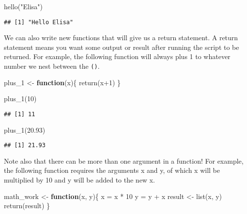 \documentclass[
]{book}
\newenvironment{Shaded}{\begin{snugshade}}{\end{snugshade}}
\newcommand{\ControlFlowTok}[1]{\textcolor[rgb]{0.13,0.29,0.53}{\textbf{#1}}}
\newcommand{\DecValTok}[1]{\textcolor[rgb]{0.00,0.00,0.81}{#1}}
\newcommand{\FloatTok}[1]{\textcolor[rgb]{0.00,0.00,0.81}{#1}}
\newcommand{\FunctionTok}[1]{\textcolor[rgb]{0.00,0.00,0.00}{#1}}
\newcommand{\NormalTok}[1]{#1}
\newcommand{\OtherTok}[1]{\textcolor[rgb]{0.56,0.35,0.01}{#1}}
\newcommand{\SpecialCharTok}[1]{\textcolor[rgb]{0.00,0.00,0.00}{#1}}
\newcommand{\StringTok}[1]{\textcolor[rgb]{0.31,0.60,0.02}{#1}}
\begin{document}
\begin{Shaded}
\begin{Highlighting}[]
\FunctionTok{hello}\NormalTok{(}\StringTok{"Elisa"}\NormalTok{)}
\end{Highlighting}
\end{Shaded}

\begin{verbatim}
## [1] "Hello Elisa"
\end{verbatim}

We can also write new functions that will give us a return statement. A return statement means you want some output or result after running the script to be returned. For example, the following function will always plus 1 to whatever number we nest between the \texttt{()}.

\begin{Shaded}
\begin{Highlighting}[]
\NormalTok{plus\_1 }\OtherTok{\textless{}{-}} \ControlFlowTok{function}\NormalTok{(x)\{}
    \FunctionTok{return}\NormalTok{(x}\SpecialCharTok{+}\DecValTok{1}\NormalTok{)}
\NormalTok{\}}
\end{Highlighting}
\end{Shaded}

\begin{Shaded}
\begin{Highlighting}[]
\FunctionTok{plus\_1}\NormalTok{(}\DecValTok{10}\NormalTok{)}
\end{Highlighting}
\end{Shaded}

\begin{verbatim}
## [1] 11
\end{verbatim}

\begin{Shaded}
\begin{Highlighting}[]
\FunctionTok{plus\_1}\NormalTok{(}\FloatTok{20.93}\NormalTok{)}
\end{Highlighting}
\end{Shaded}

\begin{verbatim}
## [1] 21.93
\end{verbatim}

Note also that there can be more than one argument in a function! For example, the following function requires the arguments x and y, of which x will be multiplied by 10 and y will be added to the new x.

\begin{Shaded}
\begin{Highlighting}[]
\NormalTok{math\_work }\OtherTok{\textless{}{-}} \ControlFlowTok{function}\NormalTok{(x, y)\{}
\NormalTok{    x }\OtherTok{=}\NormalTok{ x }\SpecialCharTok{*} \DecValTok{10}
\NormalTok{    y }\OtherTok{=}\NormalTok{ y }\SpecialCharTok{+}\NormalTok{ x}
\NormalTok{    result }\OtherTok{\textless{}{-}} \FunctionTok{list}\NormalTok{(x, y)}
    \FunctionTok{return}\NormalTok{(result)}
\NormalTok{\}}
\end{Highlighting}
\end{Shaded}
\end{document}

